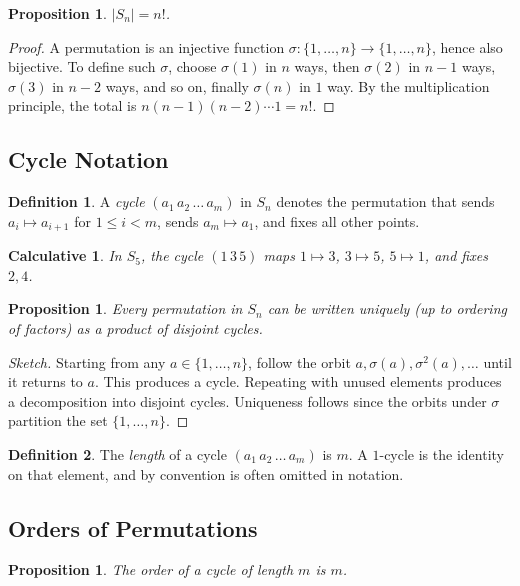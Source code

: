 \documentclass[12pt]{article}
\newtheorem{proposition}[theorem]{Proposition}
\newtheorem{calculative}[theorem]{Calculative}
\theoremstyle{definition}
\newtheorem{definition}{Definition}
\begin{document}
\begin{proposition}
$|S_n|=n!$.
\end{proposition}

\begin{proof}
A permutation is an injective function $\sigma:\{1,\dots,n\}\to\{1,\dots,n\}$, hence also bijective.
To define such $\sigma$, choose $\sigma(1)$ in $n$ ways, then $\sigma(2)$ in $n-1$ ways,
$\sigma(3)$ in $n-2$ ways, and so on, finally $\sigma(n)$ in $1$ way.
By the multiplication principle, the total is $n(n-1)(n-2)\cdots 1 = n!$.
\end{proof}

\subsection*{Cycle Notation}
\begin{definition}
A \emph{cycle} $(a_1\,a_2\,\dots\,a_m)$ in $S_n$ denotes the permutation that sends
$a_i \mapsto a_{i+1}$ for $1\leq i < m$, sends $a_m \mapsto a_1$, and fixes all other points.
\end{definition}

\begin{calculative}
In $S_5$, the cycle $(1\,3\,5)$ maps $1\mapsto 3$, $3\mapsto 5$, $5\mapsto 1$, and fixes $2,4$.
\end{calculative}

\begin{proposition}
Every permutation in $S_n$ can be written uniquely (up to ordering of factors) as a product of disjoint cycles.
\end{proposition}

\begin{proof}[Sketch]
Starting from any $a\in\{1,\dots,n\}$, follow the orbit $a,\sigma(a),\sigma^2(a),\dots$ until it returns to $a$.
This produces a cycle. Repeating with unused elements produces a decomposition into disjoint cycles.
Uniqueness follows since the orbits under $\sigma$ partition the set $\{1,\dots,n\}$.
\end{proof}

\begin{definition}
The \emph{length} of a cycle $(a_1\,a_2\,\dots\,a_m)$ is $m$. A $1$-cycle is the identity on that element,
and by convention is often omitted in notation.
\end{definition}

\subsection*{Orders of Permutations}
\begin{proposition}
The order of a cycle of length $m$ is $m$.
\end{proposition}
\end{document}
